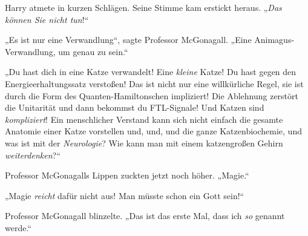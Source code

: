 Harry atmete in kurzen Schlägen. Seine Stimme kam erstickt heraus. „\emph{Das können Sie nicht \emph{tun}}!“

„Es ist nur eine Verwandlung“, sagte Professor McGonagall. „Eine Animagus-Verwandlung, um genau zu sein.“

„Du hast dich in eine Katze verwandelt! Eine \emph{kleine} Katze! Du hast gegen den Energieerhaltungssatz verstoßen! Das ist nicht nur eine willkürliche Regel, sie ist durch die Form des Quanten-Hamiltonschen impliziert! Die Ablehnung zerstört die Unitarität und dann bekommst du FTL-Signale! Und Katzen sind \emph{kompliziert}! Ein menschlicher Verstand kann sich nicht einfach die gesamte Anatomie einer Katze vorstellen und, und, und die ganze Katzenbiochemie, und was ist mit der \emph{Neurologie}? Wie kann man mit einem katzengroßen Gehirn \emph{weiterdenken}?“

Professor McGonagalls Lippen zuckten jetzt noch höher. „Magie.“

„Magie \emph{reicht} dafür nicht aus! Man müsste schon ein Gott sein!“

Professor McGonagall blinzelte. „Das ist das erste Mal, dass ich \emph{so} genannt werde.“

